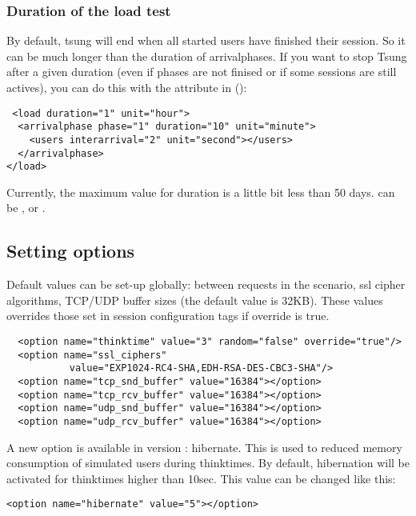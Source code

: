\documentclass{TSUNG-en}
\begin{document}
\subsubsection{Duration of the load test}

By default, tsung will end when all started users have finished their
session. So it can be much longer than the duration of
arrivalphases. If you want to stop Tsung  after a given duration
(even if phases are not finised or if some sessions are still actives),
you can do this with the  attribute in
 ():

\begin{Verbatim}
 <load duration="1" unit="hour">
  <arrivalphase phase="1" duration="10" unit="minute">
    <users interarrival="2" unit="second"></users>
  </arrivalphase>
</load>
\end{Verbatim}

Currently, the maximum value for duration is a little bit less than 50
days.  can be ,  or
.


\subsection{Setting options}

\par Default values can be set-up globally:  between requests
in the scenario,  ssl cipher algorithms, TCP/UDP buffer sizes (the default
value is 32KB). These values overrides
those set in session configuration tags if override is true.
\begin{Verbatim}
  <option name="thinktime" value="3" random="false" override="true"/>
  <option name="ssl_ciphers"
           value="EXP1024-RC4-SHA,EDH-RSA-DES-CBC3-SHA"/>
  <option name="tcp_snd_buffer" value="16384"></option>
  <option name="tcp_rcv_buffer" value="16384"></option>
  <option name="udp_snd_buffer" value="16384"></option>
  <option name="udp_rcv_buffer" value="16384"></option>
\end{Verbatim}

A new option is available in version : hibernate. This
is used to reduced memory consumption of simulated users during
thinktimes. By default, hibernation will be activated for thinktimes
higher than 10sec. This value can be changed like this:

\begin{Verbatim}
<option name="hibernate" value="5"></option>
\end{Verbatim}
\end{document}
